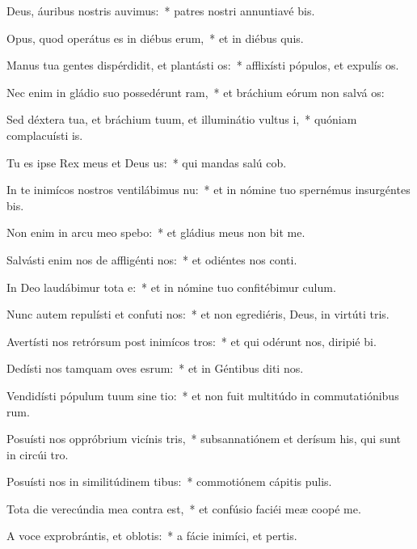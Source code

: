 \item Deus, áuribus nostris auvimus:~* patres nostri annuntiavé bis.
\item Opus, quod operátus es in diébus erum,~* et in diébus quis.
\item Manus tua gentes dispérdidit, et plantásti os:~* afflixísti pópulos, et expulís os.
\item Nec enim in gládio suo possedérunt ram,~* et bráchium eórum non salvá os:
\item Sed déxtera tua, et bráchium tuum, et illuminátio vultus i,~* quóniam complacuísti  is.
\item Tu es ipse Rex meus et Deus us:~* qui mandas salú cob.
\item In te inimícos nostros ventilábimus nu:~* et in nómine tuo spernémus insurgéntes  bis.
\item Non enim in arcu meo spebo:~* et gládius meus non bit me.
\item Salvásti enim nos de affligénti nos:~* et odiéntes nos conti.
\item In Deo laudábimur tota e:~* et in nómine tuo confitébimur  culum.
\item Nunc autem repulísti et confuti nos:~* et non egrediéris, Deus, in virtúti tris.
\item Avertísti nos retrórsum post inimícos tros:~* et qui odérunt nos, diripié bi.
\item Dedísti nos tamquam oves esrum:~* et in Géntibus diti nos.
\item Vendidísti pópulum tuum sine tio:~* et non fuit multitúdo in commutatiónibus rum.
\item Posuísti nos oppróbrium vicínis tris,~* subsannatiónem et derísum his, qui sunt in circúi tro.
\item Posuísti nos in similitúdinem tibus:~* commotiónem cápitis  pulis.
\item Tota die verecúndia mea contra  est,~* et confúsio faciéi meæ coopé me.
\item A voce exprobrántis, et oblotis:~* a fácie inimíci, et pertis.

